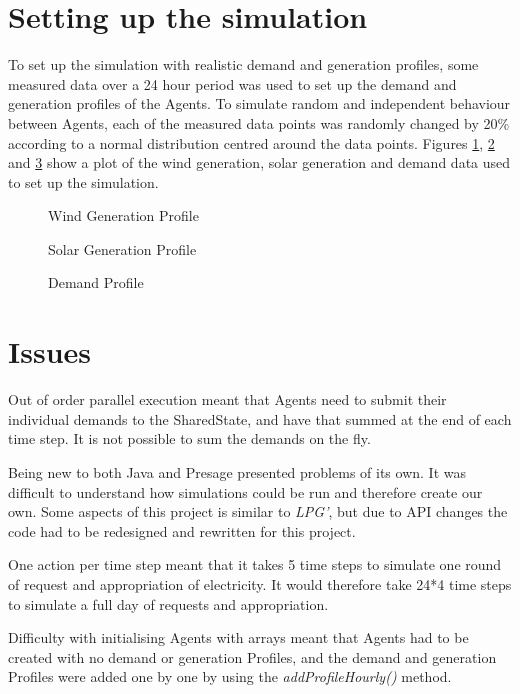 \section*{Setting up the simulation}
To set up the simulation with realistic demand and generation profiles, some measured data over a 24 hour period was used to set up the demand and generation profiles of the Agents. To simulate random and independent behaviour between Agents, each of the measured data points was randomly changed by 20\% according to a normal distribution centred around the data points. Figures \ref{fig:WindGenProfile}, \ref{fig:SolarGenProfile} and \ref{fig:DemandProfile} show a plot of the wind generation, solar generation and demand data used to set up the simulation.

\begin{figure} 
	\centering \newlength\figureheight \newlength\figurewidth 
	\setlength\figureheight{6cm} 
	\setlength\figurewidth{13cm} 
	 
	\caption{Wind Generation Profile} 
	\label{fig:WindGenProfile} 
\end{figure}

\begin{figure} 
	\centering
	\setlength\figureheight{6cm} 
	\setlength\figurewidth{13cm} 
	 
	\caption{Solar Generation Profile} 
	\label{fig:SolarGenProfile} 
\end{figure}

\begin{figure} 
	\centering
	\setlength\figureheight{6cm} 
	\setlength\figurewidth{13cm} 
	 
	\caption{Demand Profile} 
	\label{fig:DemandProfile} 
\end{figure}

\section*{Issues}
Out of order parallel execution meant that Agents need to submit their individual demands to the SharedState, and have that summed at the end of each time step. It is not possible to sum the demands on the fly.

Being new to both Java and Presage presented problems of its own. It was difficult to understand how simulations could be run and therefore create our own. Some aspects of this project is similar to \textit{LPG'}, but due to API changes the code had to be redesigned and rewritten for this project.

One action per time step meant that it takes 5 time steps to simulate one round of request and appropriation of electricity. It would therefore take 24*4 time steps to simulate a full day of requests and appropriation.

Difficulty with initialising Agents with arrays meant that Agents had to be created with no demand or generation Profiles, and the demand and generation Profiles were added one by one by using the \textit{addProfileHourly()} method.